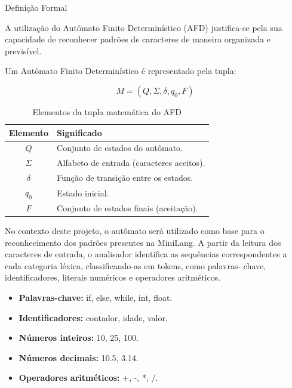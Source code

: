 \documentclass[aspectratio=169, 11pt]{beamer}
\begin{document}
\begin{frame}{Definição Formal}

	A utilização do Autômato Finito Determinístico (AFD) 
	justifica-se pela sua capacidade de reconhecer padrões 
	de caracteres de maneira organizada e previsível. 

    Um Autômato Finito Determinístico é representado pela tupla:
    
    \begin{equation}
		M = (Q, \Sigma, \delta, q_0, F)
	\end{equation}
    
    \begin{table}[h]
    \centering
    \caption{Elementos da tupla matemática do AFD}
    \begin{tabular}{|c|l|}
        \hline
        \textbf{Elemento} & \textbf{Significado} \\ \hline
        $Q$ & Conjunto de estados do autômato. \\ \hline
        $\Sigma$ & Alfabeto de entrada (caracteres aceitos). \\ \hline
        $\delta$ & Função de transição entre os estados. \\ \hline
        $q_0$ & Estado inicial. \\ \hline
        $F$ & Conjunto de estados finais (aceitação). \\ \hline
    \end{tabular}
    \label{tab:elementos-afd}
	\end{table}

\end{frame}


\begin{frame}
	
	
	No contexto deste projeto, o autômato será utilizado como base para o reconhecimento dos padrões 			presentes na MiniLang. A partir da leitura dos caracteres de entrada, o analisador identifica as 			sequências correspondentes a cada categoria léxica, classificando-as em tokens, como palavras-				chave, identificadores, literais numéricos e operadores aritméticos.
	
   \begin{itemize}
        \item \textbf{Palavras-chave:} if, else, while, int, float.
        \item \textbf{Identificadores:} contador, idade, valor.
        \item \textbf{Números inteiros:} 10, 25, 100.
        \item \textbf{Números decimais:} 10.5, 3.14.
        \item \textbf{Operadores aritméticos:} +, -, *, /.
    \end{itemize}

\end{frame}
\end{document}
